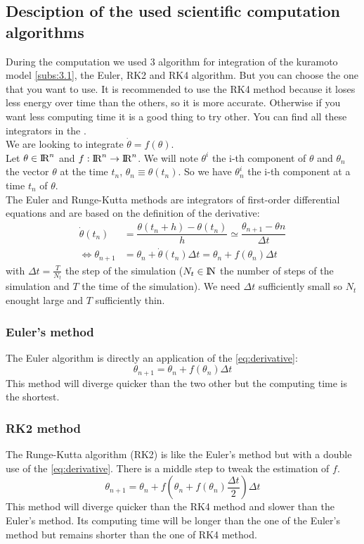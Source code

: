 \documentclass[1pt, a4paper]{article}
\begin{document}
\subsection{Desciption of the used scientific computation algorithms}
\label{subs:3.2}
During the computation we used 3 algorithm for integration of the kuramoto model \ref{subs:3.1}, the Euler, RK2 and RK4 algorithm. But you can choose the one that you want to use. It is recommended to use the RK4 method because it loses less energy over time than the others, so it is more accurate. Otherwise if you want less computing time it is a good thing to try other. You can find all these integrators in the .\\
We are looking to integrate $\dot{\theta} = f(\theta)$.\\
Let $\theta\in\mbox{I\hspace{-.15em}R}^n$ and $f:\mbox{I\hspace{-.15em}R}^n  \rightarrow  \mbox{I\hspace{-.15em}R}^n$. We will note $\theta^i$ the i-th component of $\theta$ and $\theta_n$ the vector $\theta$ at the time $t_n$, $\theta_n \equiv \theta(t_n)$. So we have $\theta^i_n$ the i-th component at a time $t_n$ of $\theta$.\\
The Euler and Runge-Kutta methods are integrators of first-order differential equations and are based on the definition of the derivative:
\begin{equation}
\label{eq:derivative}
    \begin{aligned}
        \dot{\theta}(t_n) &= \dfrac{\theta(t_n + h) - \theta(t_n)}{h}\simeq\dfrac{\theta_{n+1} - \theta{n}}{\Delta t}\\
        \iff \theta_{n+1} &= \theta_n + \dot{\theta}(t_n)\Delta t = \theta_n + f(\theta_n)\Delta t
    \end{aligned}
\end{equation}
with $\Delta t = \frac{T}{N_t}$ the step of the simulation ($N_t\in\mbox{I\hspace{-.15em}N}$ the number of steps of the simulation and $T$ the time of the simulation). We need $\Delta t$ sufficiently small so $N_t$ enought large and $T$ sufficiently thin.
\subsubsection{Euler's method}
\label{subsubs:Euler}
The Euler algorithm is directly an application of the \autoref{eq:derivative}:
\begin{equation}
    \theta_{n+1} = \theta_n + f(\theta_n)\Delta t
\end{equation}
This method will diverge quicker than the two other but the computing time is the shortest.
\newpage
\subsubsection{RK2 method}
\label{subsubs:RK2}
The Runge-Kutta algorithm (RK2) is like the Euler's method but with a double use of the \autoref{eq:derivative}. There is a middle step to tweak the estimation of $f$.
\begin{equation}
    \theta_{n+1} = \theta_n + f(\theta_n + f(\theta_n)\dfrac{\Delta t}{2})\Delta t
\end{equation}
This method will diverge quicker than the RK4 method and slower than the Euler's method. Its computing time will be longer than the one of the Euler's method but remains shorter than the one of RK4 method.
\end{document}
